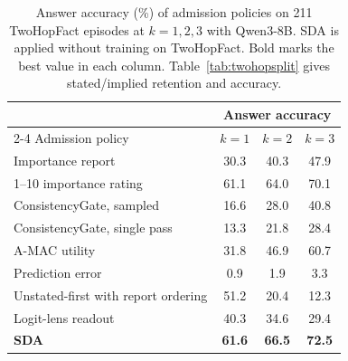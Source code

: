 \begin{table}[t]
\centering
\caption{Answer accuracy (\%) of admission policies on 211 TwoHopFact episodes at $k=1,2,3$ with Qwen3-8B. SDA is applied without training on TwoHopFact. Bold marks the best value in each column. Table~\ref{tab:twohopsplit} gives stated/implied retention and accuracy.}
\label{tab:twohop}
\footnotesize
\setlength{\tabcolsep}{3pt}
\begin{tabular}{lccc}
\toprule
 & \multicolumn{3}{c}{Answer accuracy} \\
\cmidrule(lr){2-4}
Admission policy & $k=1$ & $k=2$ & $k=3$ \\
\midrule
Importance report & 30.3 & 40.3 & 47.9 \\
1--10 importance rating & 61.1 & 64.0 & 70.1 \\
ConsistencyGate, sampled & 16.6 & 28.0 & 40.8 \\
ConsistencyGate, single pass & 13.3 & 21.8 & 28.4 \\
A-MAC utility & 31.8 & 46.9 & 60.7 \\
Prediction error & 0.9 & 1.9 & 3.3 \\
Unstated-first with report ordering & 51.2 & 20.4 & 12.3 \\
Logit-lens readout & 40.3 & 34.6 & 29.4 \\
\textbf{SDA} & \textbf{61.6} & \textbf{66.5} & \textbf{72.5} \\
\bottomrule
\end{tabular}
\end{table}
